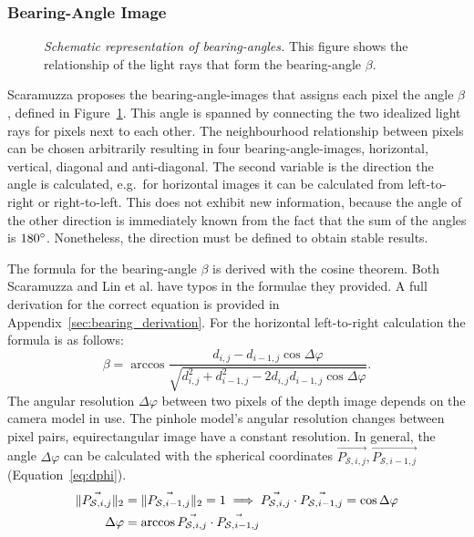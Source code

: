 \subsubsection{Bearing-Angle Image}

\begin{figure}[b!]
    \centering
    \scalebox{0.9}{%
    }
    \caption[Schematic representation of \glspl{bearing-angle}]{\emph{Schematic representation of \glspl{bearing-angle}.} This figure shows the relationship of the light rays that form the \gls{bearing-angle} $\beta$.}\label{fig:bearing_angle}
\end{figure}
Scaramuzza\cite{scaramuzza_iros2007} proposes the \Glspl{bearing-angle-image} that assigns each pixel the angle $\beta$, defined in Figure~\ref{fig:bearing_angle}.
This angle is spanned by connecting the two idealized light rays for pixels next to each other.
The neighbourhood relationship between pixels can be chosen arbitrarily resulting in four \Glspl{bearing-angle-image}, horizontal, vertical, diagonal and anti-diagonal.
The second variable is the direction the angle is calculated, e.g.~for horizontal images it can be calculated from left-to-right or right-to-left.
This does not exhibit new information, because the angle of the other direction is immediately known from the fact that the sum of the angles is $180\degree$.
Nonetheless, the direction must be defined to obtain stable results.

The formula for the \gls{bearing-angle} $\beta$ is derived with the cosine theorem.
Both Scaramuzza\cite{scaramuzza_iros2007} and Lin et al.\cite{lin_easp2017} have typos in the formulae they provided.
A full derivation for the correct equation is provided in Appendix~\ref{sec:bearing_derivation}.
For the horizontal left-to-right calculation the formula is as follows:
\begin{equation}\label{eq:bearing-angle}
    \beta = \arccos%
            \frac{d_{i,j} - d_{i-1,j} \cos \Delta\varphi}%
                {\sqrt{d_{i,j}^2 + d_{i-1,j}^2 - 2 d_{i,j} d_{i-1,j} \cos \Delta\varphi}}\text{.}
\end{equation}
The angular resolution $\Delta\varphi$ between two pixels of the depth image depends on the camera model in use.
The pinhole model's angular resolution changes between pixel pairs, equirectangular image have a constant resolution.
In general, the angle $\Delta\varphi$ can be calculated with the spherical coordinates $\vec{P_{\mathcal{S},i,j}}, \vec{P_{\mathcal{S},i-1,j}}$ (Equation~\ref{eq:dphi}).
\pagebreak
\begin{equation}
\begin{aligned}
    \lVert\vec{P_{\mathcal{S},i,j}}\rVert_{2} &= \lVert\vec{P_{\mathcal{S},i-1,j}}\rVert_{2} = 1 \implies \vec{P_{\mathcal{S},i,j}} \cdot \vec{P_{\mathcal{S},i-1,j}} = \cos \Delta\varphi \\
    \Delta\varphi &= \arccos \vec{P_{\mathcal{S},i,j}} \cdot \vec{P_{\mathcal{S},i-1,j}}
    \label{eq:dphi}
\end{aligned}
\end{equation}

